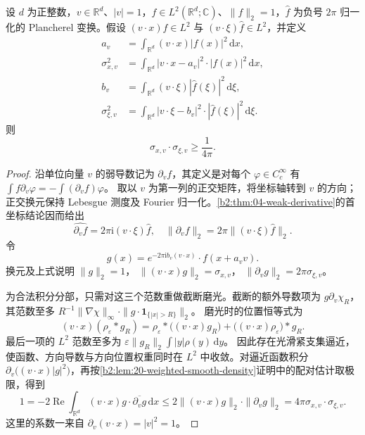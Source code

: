 \begin{corollary}\label{b2:cor:20-directional-heisenberg}
设 \(d\) 为正整数，\(v\in\mathbb R^d\)、\(|v|=1\)，\(f\in L^2(\mathbb R^d;\mathbb C)\)、\(\|f\|_2=1\)，\(\widehat f\) 为负号 \(2\pi\) 归一化的 Plancherel 变换。假设
\((v\cdot x)f\in L^2\) 与 \((v\cdot\xi)\widehat f\in L^2\)，并定义
\[
 \begin{aligned}
 a_v&=\int_{\mathbb R^d}(v\cdot x)|f(x)|^2\,\mathrm dx,\\
 \sigma_{x,v}^2&=\int_{\mathbb R^d}|v\cdot x-a_v|^2\cdot|f(x)|^2\,\mathrm dx,\\
 b_v&=\int_{\mathbb R^d}(v\cdot\xi)|\widehat f(\xi)|^2\,\mathrm d\xi,\\
 \sigma_{\xi,v}^2&=\int_{\mathbb R^d}|v\cdot\xi-b_v|^2\cdot|\widehat f(\xi)|^2\,\mathrm d\xi.
 \end{aligned}
\]
则
\[
 \sigma_{x,v}\cdot\sigma_{\xi,v}\geq\frac1{4\pi}.
\]
\end{corollary}
\begin{proof}
沿单位向量 \(v\) 的弱导数记为 \(\partial_vf\)，其定义是对每个 \(\varphi\in C_c^\infty\) 有
\(\int f\partial_v\varphi=-\int(\partial_vf)\varphi\)。
取以 \(v\) 为第一列的正交矩阵，将坐标轴转到 \(v\) 的方向；正交换元保持 Lebesgue 测度及 Fourier 归一化。\cref{b2:thm:04-weak-derivative}的首坐标结论因而给出
\[
 \widehat{\partial_vf}
 =2\pi\mathrm i(v\cdot\xi)\widehat f,
 \quad
 \|\partial_vf\|_2=2\pi\bigl\|(v\cdot\xi)\widehat f\bigr\|_2.
\]
令
\[
 g(x)=e^{-2\pi\mathrm i b_v(v\cdot x)}\cdot f(x+a_vv).
\]
换元及上式说明 \(\|g\|_2=1\)，
\(\|(v\cdot x)g\|_2=\sigma_{x,v}\)，
\(\|\partial_vg\|_2=2\pi\sigma_{\xi,v}\)。

为合法积分分部，只需对这三个范数重做截断磨光。截断的额外导数项为 \(g\partial_v\chi_R\)，其范数至多
\(R^{-1}\|\nabla\chi\|_\infty\cdot
\|g\cdot\mathbf1_{\{|x|>R\}}\|_2\)。
磨光时的位置恒等式为
\[
 (v\cdot x)(\rho_\varepsilon*g_R)
 =\rho_\varepsilon*\bigl((v\cdot x)g_R\bigr)
   +\bigl((v\cdot x)\rho_\varepsilon\bigr)*g_R.
\]
最后一项的 \(L^2\) 范数至多为
\(\varepsilon\|g_R\|_2\int|y|\rho(y)\,\mathrm dy\)。
因此存在光滑紧支集逼近，使函数、方向导数与方向位置权重同时在 \(L^2\) 中收敛。对逼近函数积分
\(\partial_v\bigl((v\cdot x)|g|^2\bigr)\)，再按\cref{b2:lem:20-weighted-smooth-density}证明中的配对估计取极限，得到
\[
 1=-2\operatorname{Re}\int_{\mathbb R^d}
        (v\cdot x)g\cdot\overline{\partial_vg}\,\mathrm dx
 \leq2\|(v\cdot x)g\|_2\cdot\|\partial_vg\|_2
 =4\pi\sigma_{x,v}\cdot\sigma_{\xi,v}.
\]
这里的系数一来自 \(\partial_v(v\cdot x)=|v|^2=1\)。
\end{proof}

